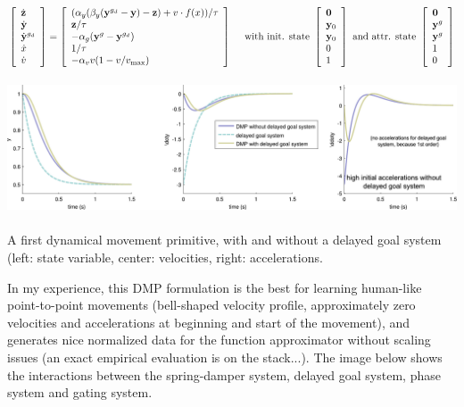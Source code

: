 \begin{eqnarray*} \left[ \begin{array}{l} {\dot{\mathbf{z}}} \\ {\dot{\mathbf{y}}} \\ {\dot{\mathbf{y}}^{g_d}} \\ {\dot{x}} \\ {\dot{v}} \end{array} \right] = \left[ \begin{array}{l} (\alpha_y (\beta_y({\mathbf{y}}^{g_d}-\mathbf{y})-\mathbf{z}) + v\cdot f(x))/\tau \\ \mathbf{z}/\tau \\ -\alpha_g({\mathbf{y}^g-\mathbf{y}^{g_d}}) \\ 1/\tau \\ -\alpha_v v (1-v/v_{\mbox{\scriptsize max}}) \end{array} \right] \mbox{~~~~with init. state~} \left[ \begin{array}{l} \mathbf{0} \\ \mathbf{y}_0 \\ \mathbf{y}_0 \\ 0 \\ 1 \end{array} \right] \mbox{~and attr. state~} \left[ \begin{array}{l} \mathbf{0} \\ \mathbf{y}^g \\ \mathbf{y}^g \\ 1 \\ 0 \end{array} \right] \end{eqnarray*}


\begin{DoxyImage}
\includegraphics[height=4cm]{dmp_and_goal_system-svg}
\caption{A first dynamical movement primitive, with and without a delayed goal system (left\+: state variable, center\+: velocities, right\+: accelerations.}
\end{DoxyImage}


In my experience, this D\+M\+P formulation is the best for learning human-\/like point-\/to-\/point movements (bell-\/shaped velocity profile, approximately zero velocities and accelerations at beginning and start of the movement), and generates nice normalized data for the function approximator without scaling issues (an exact empirical evaluation is on the stack...). The image below shows the interactions between the spring-\/damper system, delayed goal system, phase system and gating system.


